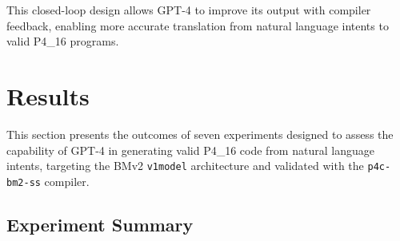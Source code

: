 \documentclass[sigconf]{acmart}
\begin{document}
This closed-loop design allows GPT-4 to improve its output with compiler feedback, enabling more accurate translation from natural language intents to valid P4\_16 programs.

\section{Results}
This section presents the outcomes of seven experiments designed to assess the capability of GPT-4 in generating valid P4\_16 code from natural language intents, targeting the BMv2 \texttt{v1model} architecture and validated with the \texttt{p4c-bm2-ss} compiler.

\subsection*{Experiment Summary}
\end{document}

